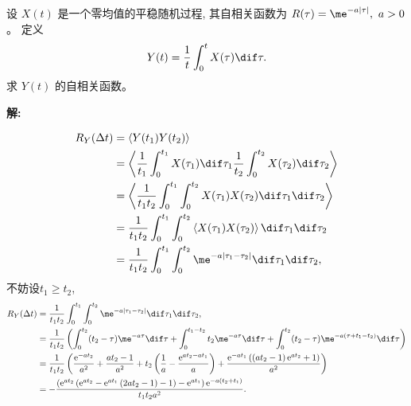 \documentclass[12pt,a4]{ctexart}
\begin{document}
设 $X(t)$ 是一个零均值的平稳随机过程, 其自相关函数为 $R(\tau)=\me^{-a|\tau|},\ a>0$。 定义
\begin{equation}
	Y(t)=\frac{1}{t} \int_{0}^{t} X(\tau) \dif \tau.
\end{equation}
求 $Y(t)$ 的自相关函数。

\textsf{\hspace{-2em}\sf  \textbf{解:}}

\begin{equation}
	\begin{aligned}
		R_Y(\Delta t) & = \left\langle Y(t_1)Y(t_2)\right\rangle                                                                                          \\
		              & = \left\langle \frac{1}{t_1} \int_{0}^{t_1} X(\tau_1) \dif \tau_1 \frac{1}{t_2} \int_{0}^{t_2} X(\tau_2) \dif \tau_2\right\rangle \\
		              & = \left\langle \frac{1}{t_1 t_2} \int_{0}^{t_1} \int_{0}^{t_2} X(\tau_1)   X(\tau_2) \dif \tau_1 \dif \tau_2\right\rangle         \\
		              & = \frac{1}{t_1 t_2} \int_{0}^{t_1} \int_{0}^{t_2}\left\langle  X(\tau_1)   X(\tau_2) \right\rangle \dif \tau_1 \dif \tau_2        \\
		              & = \frac{1}{t_1 t_2} \int_{0}^{t_1} \int_{0}^{t_2} \me^{-a|\tau_1-\tau_2|} \dif \tau_1 \dif \tau_2,                                \\
	\end{aligned}
\end{equation}
不妨设$t_1 \geqslant t_2$,
\begin{equation}
	\begin{aligned}
		R_Y(\Delta t) & = \frac{1}{t_1 t_2} \int_{0}^{t_1} \int_{0}^{t_2} \me^{-a|\tau_1-\tau_2|} \dif \tau_1 \dif \tau_2,                                                                                                                                            \\
		              & = \frac{1}{t_1 t_2} \left(\int^{t_2}_0 (t_2 - \tau) \me^{-a \tau} \dif \tau +  \int^{t_1 - t_2}_0 t_2 \me^{-a \tau} \dif \tau +  \int^{t_2}_0 (t_2 - \tau) \me^{-a (\tau+t_1-t_2)} \dif \tau   \right)                                        \\
		              & = \frac{1}{t_1 t_2} \left( \dfrac{\mathrm{e}^{-at_2}}{a^2}+\dfrac{at_2-1}{a^2} + t_2\left(\dfrac{1}{a}-\dfrac{\mathrm{e}^{at_2-at_1}}{a}\right) +  \dfrac{\mathrm{e}^{-at_1}\left(\left(at_2-1\right)\mathrm{e}^{at_2}+1\right)}{a^2} \right) \\
		              & = -\dfrac{\left(\mathrm{e}^{at_2}\left(\mathrm{e}^{at_2}-\mathrm{e}^{at_1}\left(2at_2-1\right)-1\right)-\mathrm{e}^{at_1}\right)\mathrm{e}^{-a\left(t_2+t_1\right)}}{t_1 t_2 a^2}.
	\end{aligned}
\end{equation}
\end{document}
